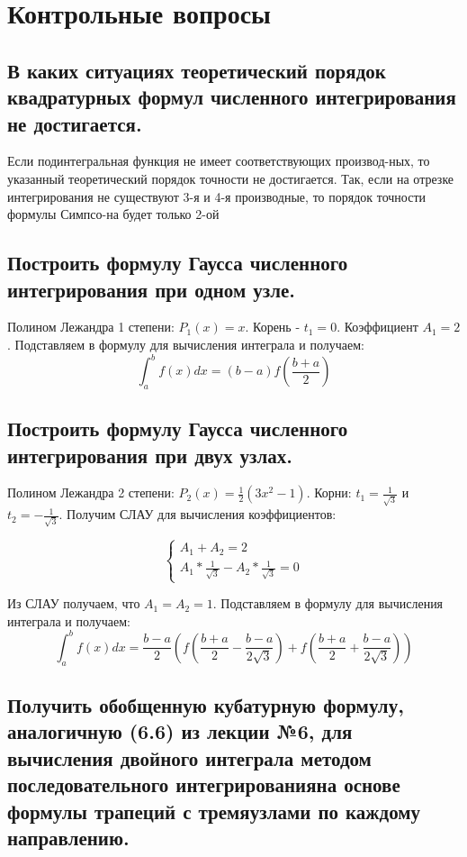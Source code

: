 \documentclass[a4paper,12pt]{article}
\begin{document}
\section{Контрольные вопросы}
\subsection{В  каких  ситуациях  теоретический  порядок  квадратурных  формул  численного интегрирования не достигается.}
Если подинтегральная функция не имеет соответствующих производ-ных, то указанный теоретический порядок точности не достигается. Так, если на отрезке интегрирования не существуют 3-я и 4-я производные, то порядок точности формулы Симпсо-на будет только 2-ой

\subsection{Построить формулу Гаусса численного интегрирования при одном узле.}
Полином Лежандра 1 степени: \(P_1(x) = x\). Корень - $t_1 = 0$. Коэффициент $A_1 = 2$. Подставляем в формулу для вычисления интеграла и получаем:
\[\int_{a}^{b}f(x)dx = (b - a)f(\frac{b + a}{2})\]

\subsection{Построить формулу Гаусса численного интегрирования при двух узлах.}
Полином Лежандра 2 степени: \(P_2(x) = \frac{1}{2}(3x^2 - 1)\). Корни: $t_1 = \frac{1}{\sqrt{3}}$ и 
$t_2 = -\frac{1}{\sqrt{3}}$. Получим СЛАУ для вычисления коэффициентов:

\[
\begin{cases}
    A_1 + A_2 = 2 \\
    A_1 * \frac{1}{\sqrt{3}} - A_2 * \frac{1}{\sqrt{3}} = 0
\end{cases}
\]

Из СЛАУ получаем, что $A_1 = A_2 = 1$. Подставляем в формулу для вычисления интеграла и получаем:
\[\int_{a}^{b}f(x)dx = \frac{b - a}{2}(f(\frac{b + a}{2} - \frac{b - a}{2\sqrt{3}}) + f(\frac{b + a}{2} + \frac{b - a}{2\sqrt{3}}))\]

\subsection{Получить обобщенную кубатурную формулу, аналогичную  (6.6)  из лекции №6, для вычисления  двойного  интеграла  методом  последовательного  интегрированияна  основе формулы трапеций с тремяузлами по каждому направлению.}
\end{document}
